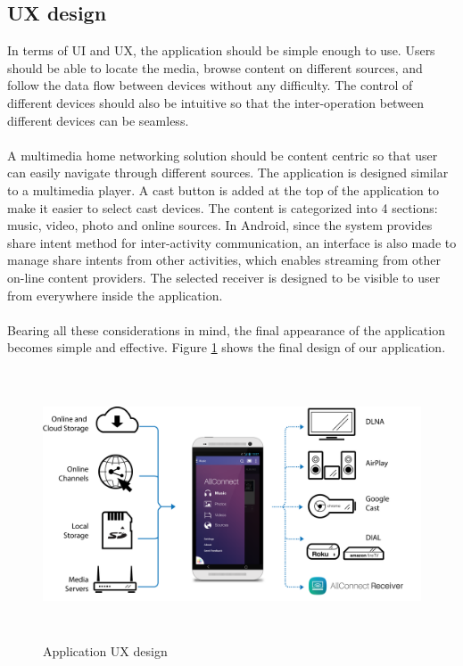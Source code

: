 \subsection{UX design\label{3_3}}
In terms of UI and UX, the application should be simple enough to use. Users should be able to locate the media, browse
 content on different sources, and follow the data flow between devices without any difficulty. The control of different devices should also be intuitive so that the inter-operation between different devices can be seamless.\\
\\
A multimedia home networking solution should be content centric so that user can easily navigate through different sources. The application is designed similar to a multimedia player. A cast button is added at the top of the application to make it easier to select cast devices. The content is categorized into 4 sections: music, video, photo and online sources. In Android, since the system provides share intent method for inter-activity communication, an interface is also made to manage share intents from other activities, which enables streaming from other on-line content providers. The selected receiver is designed to be visible to user from everywhere inside the application. \\
\\
Bearing all these considerations in mind, the final appearance of the application becomes simple and effective. Figure \ref{chart5} shows the final design of our application.
\begin{figure}[htb]
\centering \includegraphics[height=8cm]{charts/allconnect-app}
\caption{Application UX design \label{chart5}}
\end{figure}

